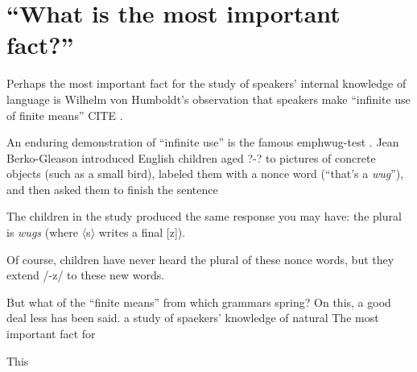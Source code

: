 \section{``What is the most important fact?''}

Perhaps the most important fact for the study of speakers' internal knowledge of language is Wilhelm von Humboldt's observation that speakers make ``infinite use of finite means'' CITE \citep{Chomsky1966}. 

An enduring demonstration of ``infinite use'' is the famous emph{wug-test} \citep{Berko1958}. Jean Berko-Gleason introduced English children aged ?-? to pictures of concrete objects (such as a small bird), labeled them with a nonce word (``that's a \emph{wug}''), and then asked them to finish the sentence

The children in the study produced the same response you may have: the plural is \emph{wugs} (where $\langle$s$\rangle$ writes a final [z]). 

Of course, children have never heard the plural of these nonce words, but they extend /-z/ to these new words. 

But what of the ``finite means'' from which grammars spring? On this, a good deal less has been said.
a study of spaekers' knowledge of natural
The most important fact for 


This 
